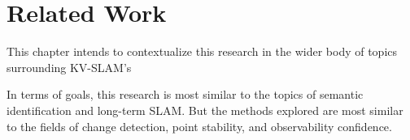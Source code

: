 \section{Related Work}
\label{sec:related_work}

This chapter intends to contextualize this research in the wider body of topics surrounding KV-SLAM's 

In terms of goals, this research is most similar to the topics of semantic identification and long-term SLAM. But the methods explored are most similar to the fields of change detection, point stability, and observability confidence.

% 